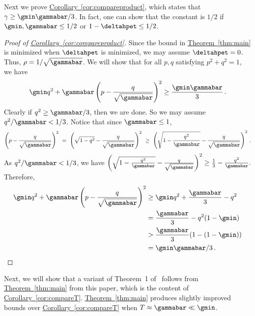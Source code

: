 \documentclass[11pt]{article}
\providecommand{\expref}[2]{\texorpdfstring{\hyperref[#2]{#1~\ref{#2}}}{#1~\ref{#2}}}
\begin{document}
Next we prove \expref{Corollary}{cor:compareproduct}, which states that $\gamma\geq \gmin\gammabar/3$.
In fact, one can show that the constant is $1/2$ if $\gmin,\gammabar\leq 1/2$ or
$1-\deltahpet\leq 1/2$.

%
%
%
\begin{proof}[Proof of \expref{Corollary}{cor:compareproduct}]
Since the bound in \expref{Theorem}{thm:main} is minimized when 
$\deltahpet$ is minimized, we may assume $\deltahpet=0$.
Thus, $\rho=1/\sqrt{\gammabar}$.  We will show that for all $p,q$
satisfying $p^2+q^2=1$, we have
\[\gmin q^2+\gammabar\left(p - \frac{q}{\sqrt{\gammabar}}\right)^2\geq
\frac{ \gmin\gammabar}{3}\,.\]
Clearly if $q^2\geq \gammabar/3$, then we are done.  So we may assume
$q^2/\gammabar<1/3$.  Notice that since $\gammabar\leq 1$,
\[\left(p - \frac{q}{\sqrt{\gammabar}}\right)^2
~=~ \left(\sqrt{1-q^2} - \frac{q}{\sqrt{\gammabar}}\right)^2
~\geq~ \left(\sqrt{1-\frac{q^2}{\gammabar}} -
\frac{q}{\sqrt{\gammabar}}\right)^2\,.\]
As $q^2/\gammabar<1/3$, we have
$\left(\sqrt{1-\frac{q^2}{\gammabar}} -
\frac{q}{\sqrt{\gammabar}}\right)^2\geq \frac{1}{3} -
\frac{q^2}{\gammabar}.$  Therefore,
\begin{align*}
  \gmin q^2+\gammabar\left(p -  \frac{q}{\sqrt{\gammabar}}\right)^2
  &\geq  \gmin q^2+\frac{\gammabar}{3} -q^2\\
  &= \frac{\gammabar}{3} - q^2(1-\gmin)\\
  &> \frac{\gammabar}{3}(1-(1-\gmin)) \\
  &= \gmin\gammabar/3\,.\qedhere
\end{align*}
\end{proof}
%

Next, we will show that a variant of Theorem~1 of~\cite{jstv04} follows from
\expref{Theorem}{thm:main} from this paper, which is the content of
\expref{Corollary}{cor:compareT}.  \expref{Theorem}{thm:main} produces
slightly improved bounds over \expref{Corollary}{cor:compareT} when
$T\approx \gammabar\ll \gmin$.  
\end{document}

